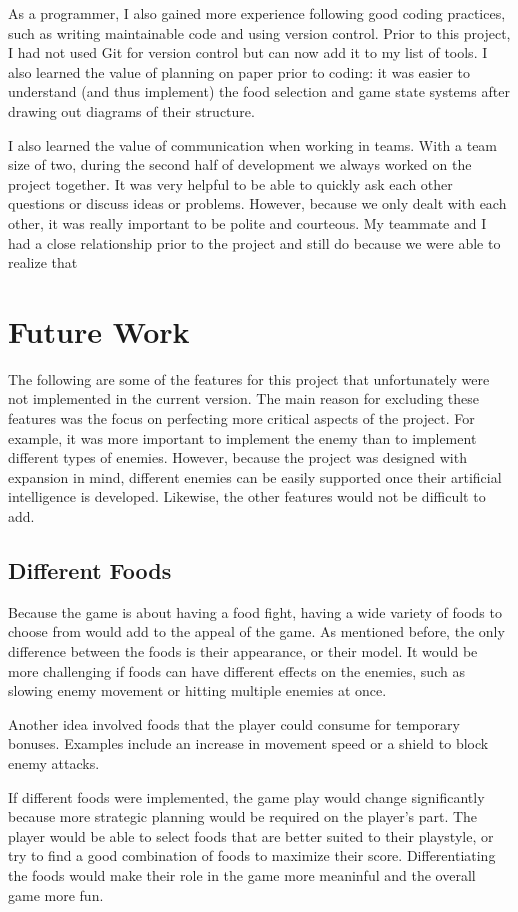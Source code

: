 \documentclass{article}
\begin{document}
As a programmer, I also gained more experience following good coding practices, such as writing maintainable code and using version control. Prior to this project, I had not used Git for version control but can now add it to my list of tools. I also learned the value of planning on paper prior to coding: it was easier to understand (and thus implement) the food selection and game state systems after drawing out diagrams of their structure.

I also learned the value of communication when working in teams. With a team size of two, during the second half of development we always worked on the project together. It was very helpful to be able to quickly ask each other questions or discuss ideas or problems. However, because we only dealt with each other, it was really important to be polite and courteous. My teammate and I had a close relationship prior to the project and still do because we were able to realize that 

\section{Future Work}
The following are some of the features for this project that unfortunately were not implemented in the current version. The main reason for excluding these features was the focus on perfecting more critical aspects of the project. For example, it was more important to implement the enemy than to implement different types of enemies. However, because the project was designed with expansion in mind, different enemies can be easily supported once their artificial intelligence is developed. Likewise, the other features would not be difficult to add.

\subsection{Different Foods}
Because the game is about having a food fight, having a wide variety of foods to choose from would add to the appeal of the game. As mentioned before, the only difference between the foods is their appearance, or their model. It would be more challenging if foods can have different effects on the enemies, such as slowing enemy movement or hitting multiple enemies at once.

Another idea involved foods that the player could consume for temporary bonuses. Examples include an increase in movement speed or a shield to block enemy attacks.

If different foods were implemented, the game play would change significantly because more strategic planning would be required on the player's part. The player would be able to select foods that are better suited to their playstyle, or try to find a good combination of foods to maximize their score. Differentiating the foods would make their role in the game more meaninful and the overall game more fun.
\end{document}
